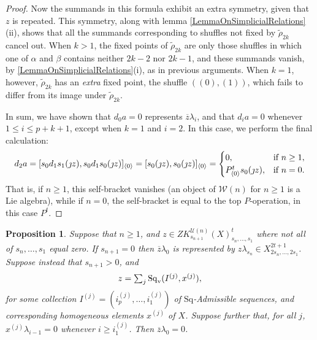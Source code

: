 \documentclass[11pt]{amsart}
\theoremstyle{plain}
\newtheorem{prop}[thm]{Proposition}
\theoremstyle{definition}
\newcommand{\calU}{\mathcal{U}}
\newcommand{\calw}{\mathcal{W}}
\theoremstyle{plain}
\newcommand{\Sq}{\mathrm{Sq}}
\newcommand{\Sqv}{\mathrm{Sq}_\textup{v}}
\begin{document}
\begin{Koszul complexes}
\begin{proof}
Now the summands in this formula exhibit an extra symmetry, given that $z$ is repeated. This symmetry, along with lemma \ref{LemmaOnSimplicialRelations}(ii), shows that all the summands corresponding to shuffles not fixed by $\widetilde{\rho}_{2k}$ cancel out. When $k>1$, the fixed points of $\widetilde{\rho}_{2k}$ are only those shuffles in which one of $\alpha$ and $\beta$ contains neither $2k-2$ nor $2k-1$, and these summands vanish, by \ref{LemmaOnSimplicialRelations}(i), as in previous arguments. When $k=1$, however, $\widetilde{\rho}_{2k}$ has an \emph{extra} fixed point, the shuffle $((0),(1))$, which fails to differ from its image under $\widetilde{\rho}_{2k}$.

In sum, we have shown that $d_0a=0$ represents $\overline{z}\lambda_i$, and that $d_ia=0$ whenever $1\leq i\leq p+k+1$, except when $k=1$ and $i=2$. In this case, we perform the final calculation:
\[d_2a=[s_{0}d_1s_1(\jmath z), s_{0}d_1s_0(\jmath z)]_{\langle 0\rangle}=[s_{0}(\jmath z), s_{0}(\jmath z)]_{\langle 0\rangle}=\begin{cases}
0,&\textup{if }n\geq1,\\
P^{t}_{\langle 0\rangle}s_0(\jmath z),&\textup{if }n=0.
\end{cases}\]
That is, if $n\geq1$, this self-bracket vanishes (an object of $\calw(n)$ for $n\geq1$ is a Lie algebra), while if $n=0$, the self-bracket is equal to the top $P$-operation, in this case $P^t$. %
\end{proof}
\begin{prop}\label{Q0ZeroByPriddyAlg}
Suppose that $n\geq1$, and $z\in ZK^{\calU(n)}_{s_{n+1}}(X)_{s_n,\ldots,s_1}^t$ where not all of $s_n,\ldots,s_1$ equal zero. If $s_{n+1}=0$ then $\overline{z}\lambda_0$ is represented by $z\lambda_{s_n}\in X_{2s_n,\ldots,2s_1}^{2t+1}$. Suppose instead that $s_{n+1}>0$, and 
\[z=\textstyle\sum_{j}\Sqv(I^{(j)},x^{(j)}),\]
for some collection $I^{(j)}=(i^{(j)}_{p},\ldots,i^{(j)}_{1})$ of  $\Sq$-Admissible sequences, and corresponding homogeneous elements $x^{(j)}$ of $X$. Suppose further that, for all $j$, $x^{(j)}\lambda_{i-1}=0$ whenever $i\geq i^{{(j)}}_1$. Then $\overline{z}\lambda_0=0$.
\end{prop}

\end{Koszul complexes}
\end{document}

